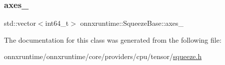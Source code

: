 \subsubsection{\texorpdfstring{axes\+\_\+}{axes\_}}
{\footnotesize\ttfamily std\+::vector$<$int64\+\_\+t$>$ onnxruntime\+::\+Squeeze\+Base\+::axes\+\_\+\hspace{0.3cm}{\ttfamily [protected]}}



The documentation for this class was generated from the following file\+:\begin{DoxyCompactItemize}
\item 
onnxruntime/onnxruntime/core/providers/cpu/tensor/\mbox{\hyperlink{cpu_2tensor_2squeeze_8h}{squeeze.\+h}}\end{DoxyCompactItemize}
